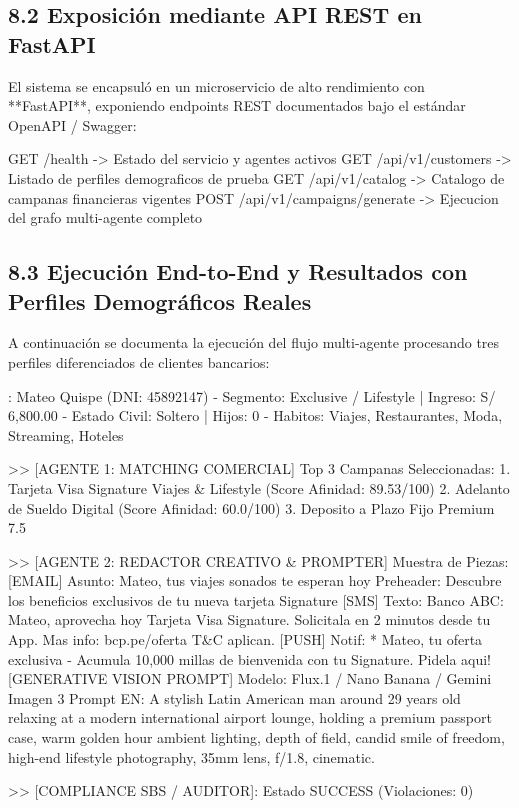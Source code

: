 \subsection{8.2 Exposición mediante API REST en FastAPI}
El sistema se encapsuló en un microservicio de alto rendimiento con **FastAPI**, exponiendo endpoints REST documentados bajo el estándar OpenAPI / Swagger:

\begin{azureterminal}
GET  /health                   -> Estado del servicio y agentes activos
GET  /api/v1/customers         -> Listado de perfiles demograficos de prueba
GET  /api/v1/catalog           -> Catalogo de campanas financieras vigentes
POST /api/v1/campaigns/generate -> Ejecucion del grafo multi-agente completo
\end{azureterminal}

\subsection{8.3 Ejecución End-to-End y Resultados con Perfiles Demográficos Reales}
A continuación se documenta la ejecución del flujo multi-agente procesando tres perfiles diferenciados de clientes bancarios:

\begin{azureterminal}: Mateo Quispe (DNI: 45892147)
  - Segmento: Exclusive / Lifestyle | Ingreso: S/ 6,800.00
  - Estado Civil: Soltero | Hijos: 0
  - Habitos: Viajes, Restaurantes, Moda, Streaming, Hoteles

  >> [AGENTE 1: MATCHING COMERCIAL] Top 3 Campanas Seleccionadas:
     1. Tarjeta Visa Signature Viajes & Lifestyle (Score Afinidad: 89.53/100)
     2. Adelanto de Sueldo Digital (Score Afinidad: 60.0/100)
     3. Deposito a Plazo Fijo Premium 7.5%

  >> [AGENTE 2: REDACTOR CREATIVO & PROMPTER] Muestra de Piezas:
     [EMAIL]
       Asunto:    Mateo, tus viajes sonados te esperan hoy
       Preheader: Descubre los beneficios exclusivos de tu nueva tarjeta Signature
     [SMS]
       Texto:     Banco ABC: Mateo, aprovecha hoy Tarjeta Visa Signature. Solicitala en 2 minutos desde tu App. Mas info: bcp.pe/oferta T&C aplican.
     [PUSH]
       Notif:     * Mateo, tu oferta exclusiva - Acumula 10,000 millas de bienvenida con tu Signature. Pidela aqui!
     [GENERATIVE VISION PROMPT]
       Modelo:    Flux.1 / Nano Banana / Gemini Imagen 3
       Prompt EN: A stylish Latin American man around 29 years old relaxing at a modern international airport lounge, holding a premium passport case, warm golden hour ambient lighting, depth of field, candid smile of freedom, high-end lifestyle photography, 35mm lens, f/1.8, cinematic.

  >> [COMPLIANCE SBS / AUDITOR]: Estado SUCCESS (Violaciones: 0)
\end{azureterminal}

